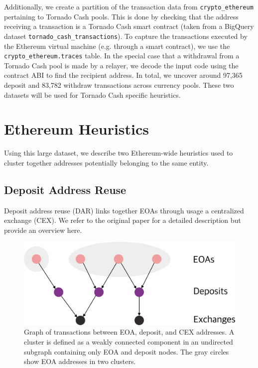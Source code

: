\documentclass[11pt,a4paper]{article}
\begin{document}
Additionally, we create a partition of the transaction data from \texttt{crypto\_ethereum} pertaining to Tornado Cash pools. This is done by checking that the address receiving a transaction is a Tornado Cash smart contract (taken from a BigQuery dataset \texttt{tornado\_cash\_transactions}). To capture the transactions executed by the Ethereum virtual machine (e.g. through a smart contract), we use the \texttt{crypto\_ethereum.traces} table. In the special case that a withdrawal from a Tornado Cash pool is made by a relayer, we decode the input code using the contract ABI to find the recipient address. In total, we uncover around 97,365 deposit and 83,782 withdraw transactions across currency pools. These two datasets will be used for Tornado Cash specific heuristics.

\section{Ethereum Heuristics}
\label{sec:eth}

Using this large dataset, we describe two Ethereum-wide heuristics used to cluster together addresses potentially belonging to the same entity.

\subsection{Deposit Address Reuse}
\label{sec:dar}

Deposit address reuse (DAR) links together EOAs through usage a centralized exchange (CEX). We refer to the original paper \citep{victor2020address} for a detailed description but provide an overview here.

\begin{figure}[b!]
\includegraphics[width=\linewidth]{figures/dar.pdf}
\caption{Graph of transactions between EOA, deposit, and CEX addresses. A cluster is defined as a weakly connected component in an undirected subgraph containing only EOA and deposit nodes. The gray circles show EOA addresses in two clusters.}
\label{fig:dar}
\end{figure}
\end{document}
